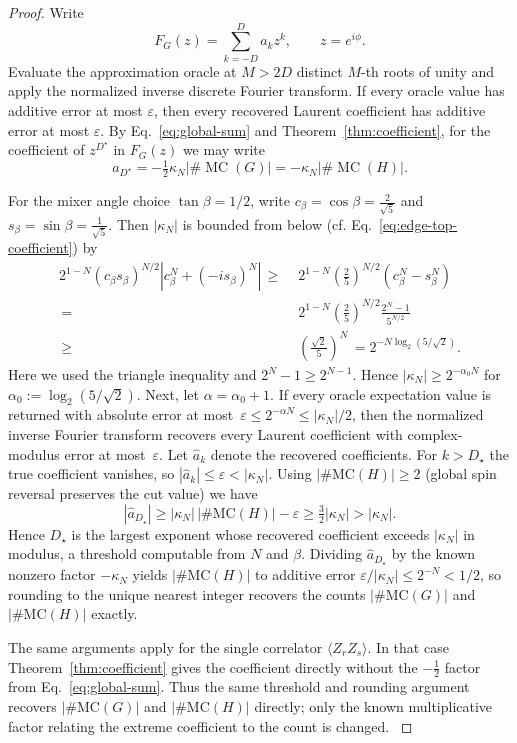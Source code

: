 \documentclass[11pt]{article}
\newcommand{\mc}{\operatorname{MC}}
\newcommand{\M}{\#\mc}
\newcommand{\sh}[1]{{#1}}
\begin{document}
\begin{proof}
Write
\[
   F_G(z)=\sum_{k=-D}^{D}a_kz^k,
   \qquad z=e^{i\phi}.
\]
Evaluate the approximation oracle at \(M>2D\) distinct \(M\)-th
roots of unity and apply the normalized inverse discrete Fourier
transform.  If every oracle value has additive error at most
\(\varepsilon\), then every recovered Laurent coefficient has
additive error at most \(\varepsilon\).  %
\sh{
By Eq.~\eqref{eq:global-sum} and Theorem~\ref{thm:coefficient}, %
for the coefficient of $z^{D^\star}$ in \(F_G(z)\) we may write}
\[
a_{D^\star} = -\tfrac12\kappa_N |\M(G)| = -\kappa_N |\M(H)|. 
\]






For the mixer angle choice $\tan\beta=1/2$, write
$c_\beta=\cos\beta=\frac{2}{\sqrt{5}}$
and 
$s_\beta=\sin\beta=\frac{1}{\sqrt{5}}$.
Then %
$|\kappa_N|$ is bounded
from below (cf. Eq.~\eqref{eq:edge-top-coefficient}) by
\begin{align}
2^{1-N}(c_\beta s_\beta)^{N/2}
 \left|c_\beta^N+(-is_\beta)^N\right|
\nonumber
\,\geq&\,\,
2^{1-N}\left(\tfrac{2}{5}\right)^{N/2}
 \left(c_\beta^N-s_\beta^N\right)
\nonumber\\
\,=&\,\,
2^{1-N}\left(\tfrac{2}{5}\right)^{N/2}
 \tfrac{2^N-1}{5^{N/2}}
\nonumber\\
\,\geq&\,\,
\left(\tfrac{\sqrt{2}}{5}\right)^N\,
=
2^{-N\log_2(5/\sqrt{2})}.
\end{align}
Here we used the %
triangle inequality and
$2^N-1\geq 2^{N-1}$.  
Hence $|\kappa_N|\ge 2^{-\alpha_0 N}$ for %
$\alpha_0:=\log_2(5/\sqrt2)$.  
%
Next, let $\alpha = \alpha_0+1$. 
If every oracle expectation value is returned with absolute error at most~$\varepsilon\leq 2^{-\alpha N}\leq |\kappa_N|/2$, then the normalized inverse Fourier transform recovers every
Laurent coefficient with complex-modulus error at most~$\varepsilon$.  
%
Let $\widehat a_k$ denote the recovered coefficients. For
$k>D_\star$ the true coefficient vanishes, so
$|\widehat a_k|\le\varepsilon<|\kappa_N|$. Using 
$|\#\mathrm{MC}(H)|\ge2$ %
(global spin reversal preserves the cut value) 
we have 
$$|\widehat a_{D_\star}|\ge|\kappa_N|\,|\#\mathrm{MC}(H)| -\varepsilon\ge\tfrac32|\kappa_N|>|\kappa_N|.$$ 
Hence $D_\star$ is
the largest exponent whose recovered coefficient exceeds
$|\kappa_N|$ in modulus, a threshold computable from $N$ and
$\beta$. 
Dividing $\widehat a_{D_\star}$ by the known
nonzero factor $-\kappa_N$ yields $|\#\mathrm{MC}(H)|$ to additive error
$\varepsilon/|\kappa_N|\le 2^{-N}<1/2$, so rounding to the
unique nearest integer recovers the counts $|\#\mathrm{MC}(G)|$ and $|\#\mathrm{MC}(H)|$ exactly.


\sh{%
The same arguments apply for the %
single correlator
\(\langle Z_rZ_s\rangle\). In that case %
Theorem~\ref{thm:coefficient} gives the coefficient directly without the %
\(-\tfrac12\) factor from Eq.~\eqref{eq:global-sum}. 
 Thus the same
threshold and rounding argument recovers $|\#\mathrm{MC}(G)|$ and $|\#\mathrm{MC}(H)|$ directly; only
the known multiplicative factor relating the extreme coefficient to
the count is changed.
}


\end{proof}
\end{document}
